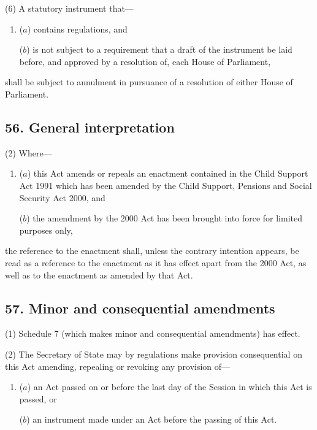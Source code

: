 \documentclass[12pt,a4paper]{article}
\begin{document}
(6) A statutory instrument that---
\begin{enumerate}\item[]
($a$) contains regulations, and

($b$) is not subject to a requirement that a draft of the instrument be laid before, and approved by a resolution of, each House of Parliament,
\end{enumerate}
shall be subject to annulment in pursuance of a resolution of either House of Parliament.


\subsection{56. General interpretation}


(2) Where—
\begin{enumerate}\item[]
($a$) this Act amends or repeals an enactment contained in the Child Support Act 1991 which has been amended by the Child Support, Pensions and Social Security Act 2000, and

($b$) the amendment by the 2000 Act has been brought into force for limited purposes only,
\end{enumerate}
the reference to the enactment shall, unless the contrary intention appears, be read as a reference to the enactment as it has effect apart from the 2000 Act, as well as to the enactment as amended by that Act.


\subsection{57. Minor and consequential amendments}

(1) Schedule 7 (which makes minor and consequential amendments) has effect.

(2) The Secretary of State may by regulations make provision consequential on this Act amending, repealing or revoking any provision of—
\begin{enumerate}\item[]
($a$) an Act passed on or before the last day of the Session in which this Act is passed, or

($b$) an instrument made under an Act before the passing of this Act.
\end{enumerate}
\end{document}
